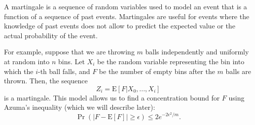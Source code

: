 \documentclass[11pt]{article}
\theoremstyle{mytheoremstyle}
\begin{document}
A martingale is a sequence of random variables used to model an event
that is a function of a sequence of past events. Martingales are useful
for events where the knowledge of past events does not allow to predict
the expected value or the actual probability of the event. 

For example, suppose that we are throwing $m$ balls independently
and uniformly at random into $n$ bins. Let $X_{i}$ be the random
variable representing the bin into which the $i$-th ball falls, and
$F$ be the number of empty bins after the $m$ balls are thrown.
Then, the sequence 
\[
Z_{i}=\mathrm{E}[F|X_{0},...,X_{i}]
\]
is a martingale. This model allows us to find a concentration bound
for $F$ using Azuma's inequality (which we will describe later):
\[
\Pr(|F-\mathrm{E}[F]|\geq\epsilon)\leq2e^{-2\epsilon^{2}/m}.
\]
\end{document}
